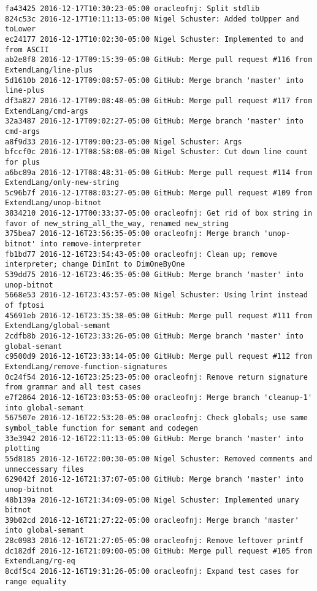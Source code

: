 \begin{lstlisting}
fa43425 2016-12-17T10:30:23-05:00 oracleofnj: Split stdlib
824c53c 2016-12-17T10:11:13-05:00 Nigel Schuster: Added toUpper and toLower
ec24177 2016-12-17T10:02:30-05:00 Nigel Schuster: Implemented to and from ASCII
ab2e8f8 2016-12-17T09:15:39-05:00 GitHub: Merge pull request #116 from ExtendLang/line-plus
5d1610b 2016-12-17T09:08:57-05:00 GitHub: Merge branch 'master' into line-plus
df3a827 2016-12-17T09:08:48-05:00 GitHub: Merge pull request #117 from ExtendLang/cmd-args
32a3487 2016-12-17T09:02:27-05:00 GitHub: Merge branch 'master' into cmd-args
a8f9d33 2016-12-17T09:00:23-05:00 Nigel Schuster: Args
bfccf0c 2016-12-17T08:58:08-05:00 Nigel Schuster: Cut down line count for plus
a6bc89a 2016-12-17T08:48:31-05:00 GitHub: Merge pull request #114 from ExtendLang/only-new-string
5c96b7f 2016-12-17T08:03:27-05:00 GitHub: Merge pull request #109 from ExtendLang/unop-bitnot
3834210 2016-12-17T00:33:37-05:00 oracleofnj: Get rid of box string in favor of new_string_all_the_way, renamed new_string
375bea7 2016-12-16T23:56:35-05:00 oracleofnj: Merge branch 'unop-bitnot' into remove-interpreter
fb1bd77 2016-12-16T23:54:43-05:00 oracleofnj: Clean up; remove interpreter; change DimInt to DimOneByOne
539dd75 2016-12-16T23:46:35-05:00 GitHub: Merge branch 'master' into unop-bitnot
5668e53 2016-12-16T23:43:57-05:00 Nigel Schuster: Using lrint instead of fptosi
45691eb 2016-12-16T23:35:38-05:00 GitHub: Merge pull request #111 from ExtendLang/global-semant
2cdfb8b 2016-12-16T23:33:26-05:00 GitHub: Merge branch 'master' into global-semant
c9500d9 2016-12-16T23:33:14-05:00 GitHub: Merge pull request #112 from ExtendLang/remove-function-signatures
0c24f54 2016-12-16T23:25:23-05:00 oracleofnj: Remove return signature from grammar and all test cases
e7f2864 2016-12-16T23:03:53-05:00 oracleofnj: Merge branch 'cleanup-1' into global-semant
567507e 2016-12-16T22:53:20-05:00 oracleofnj: Check globals; use same symbol_table function for semant and codegen
33e3942 2016-12-16T22:11:13-05:00 GitHub: Merge branch 'master' into plotting
55d8185 2016-12-16T22:00:30-05:00 Nigel Schuster: Removed comments and unneccessary files
629042f 2016-12-16T21:37:07-05:00 GitHub: Merge branch 'master' into unop-bitnot
48b139a 2016-12-16T21:34:09-05:00 Nigel Schuster: Implemented unary bitnot
39b02cd 2016-12-16T21:27:22-05:00 oracleofnj: Merge branch 'master' into global-semant
28c0983 2016-12-16T21:27:05-05:00 oracleofnj: Remove leftover printf
dc182df 2016-12-16T21:09:00-05:00 GitHub: Merge pull request #105 from ExtendLang/rg-eq
8cdf5c4 2016-12-16T19:31:26-05:00 oracleofnj: Expand test cases for range equality

\end{lstlisting}
